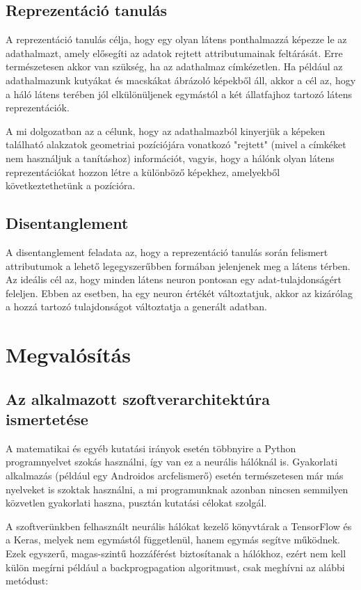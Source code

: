 \section{Reprezentáció tanulás}

A reprezentáció tanulás célja, hogy egy olyan látens ponthalmazzá képezze le az adathalmazt, amely elősegíti az adatok rejtett attributumainak feltárását. Erre természetesen akkor van szükség, ha az adathalmaz címkézetlen. Ha például az adathalmazunk kutyákat és macskákat ábrázoló képekből áll, akkor a cél az, hogy a háló látens terében jól elkülönüljenek egymástól a két állatfajhoz tartozó látens reprezentációk.

A mi dolgozatban az a célunk, hogy az adathalmazból kinyerjük a képeken található alakzatok geometriai pozíciójára vonatkozó "rejtett" (mivel a címkéket nem használjuk a tanításhoz) információt, vagyis, hogy a hálónk olyan látens reprezentációkat hozzon létre a különböző képekhez, amelyekből következtethetünk a pozícióra.

\section{Disentanglement}

A disentanglement feladata az, hogy a reprezentáció tanulás során felismert attributumok a lehető legegyszerűbben formában jelenjenek meg a látens térben. Az ideális cél az, hogy minden látens neuron pontosan egy adat-tulajdonságért feleljen. Ebben az esetben, ha egy neuron értékét változtatjuk, akkor az kizárólag a hozzá tartozó tulajdonságot változtatja a generált adatban.

\chapter{Megvalósítás}

\section{Az alkalmazott szoftverarchitektúra ismertetése}

A matematikai és egyéb kutatási irányok esetén többnyire a Python programnyelvet szokás használni, így van ez a neurális hálóknál is. Gyakorlati alkalmazás (például egy Androidos arcfelismerő) esetén természetesen már más nyelveket is szoktak használni, a mi programunknak azonban nincsen semmilyen közvetlen gyakorlati haszna, pusztán kutatási célokat szolgál.

A szoftverünkben felhasznált neurális hálókat kezelő könyvtárak a TensorFlow és a Keras, melyek nem egymástól függetlenül, hanem egymás segítve működnek. Ezek egyszerű, magas-szintű hozzáférést biztosítanak a hálókhoz, ezért nem kell külön megírni például a backprogpagation algoritmust, csak meghívni az alábbi metódust:

